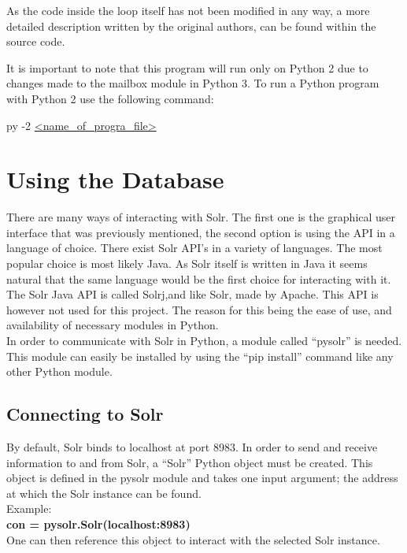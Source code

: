 \documentclass[a4paper,english]{report}
\begin{document}




As the code inside the loop itself has not been modified in any way, a more detailed description written by the original authors, can be found within the source code.


It is important to note that this program will run only on Python 2 due to changes made to the mailbox  module in Python 3.
To run a Python program with Python 2 use the following command:

py -2 \url{<name_of_progra_file>}


\chapter{Using the Database}

There are many ways of interacting with Solr. The first one is the graphical user interface that was previously mentioned, the second option is using the API in a language of choice. There exist Solr API’s in a variety of languages. The most popular choice is most likely Java. As Solr itself is written in Java it seems natural that the same language would be the first choice for interacting with it. The Solr Java API is called Solrj,and like Solr, made by Apache.
This API is however not used for this project. The reason for this being the ease of use, and availability of necessary modules in Python.\\
 In order to communicate with Solr in Python, a module called “pysolr” is needed. This module can easily be installed by using the “pip install” command like any other Python module.


\section{Connecting to Solr}


By default, Solr binds to localhost at port 8983. In order to send and receive information to and from Solr, a “Solr” Python object must be created. This object is defined in the pysolr module and takes one input argument;  the address at which the Solr instance can be found.\\
Example:\\

\textbf{	con = pysolr.Solr(localhost:8983)}\\

One can then reference this object to interact with the selected Solr instance.
\end{document}
